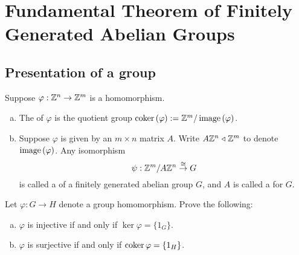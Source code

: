 \documentclass[../algebraNotesMSRI-UP2016.tex]{subfiles}
\begin{document}
\section[\S \thesection]{Fundamental Theorem of Finitely Generated Abelian Groups}\label{sec:2p10FTOFinitelyGeneratedAbelianGroups}
\subsection[\subsecname]{Presentation of a group}
\begin{frame}{\subsecname}{}
\begin{dfn}
Suppose $\varphi:\mathbb Z^n\to \mathbb Z^m$ is a homomorphism.
\begin{enumerate}[(a)]
\item The  of $\varphi$ is the quotient group $\operatorname{coker}{(\varphi)}:=\mathbb Z^m/	\operatorname{image}{(\varphi)}$.
\item Suppose $\varphi$ is given by an $m\times n$ matrix $A$.  Write $A\mathbb Z^n\mathrel{\triangleleft} \mathbb Z^m$ to denote $\operatorname{image}{(\varphi)}$.  Any isomorphism
\[
\psi: \mathbb Z^m/A\mathbb Z^n\overset{\cong}{\to} G
\]
is called a  of a finitely generated abelian group $G$, and $A$ is called a  for $G$.
\end{enumerate}
\end{dfn}
\end{frame}

\begin{frame}[c]{}{}
\begin{exe}\label{exe:kernelsAndCokernels}
Let $\varphi:G\to H$ denote a group homomorphism.  Prove the following:
\begin{enumerate}[(a)]
\item $\varphi$ is injective if and only if $\ker{\varphi}=\{1_G\}$.
\item $\varphi$ is surjective if and only if $\operatorname{coker}{\varphi}=\{1_H\}$.
\end{enumerate}
\end{exe}
\end{frame}
\end{document}

